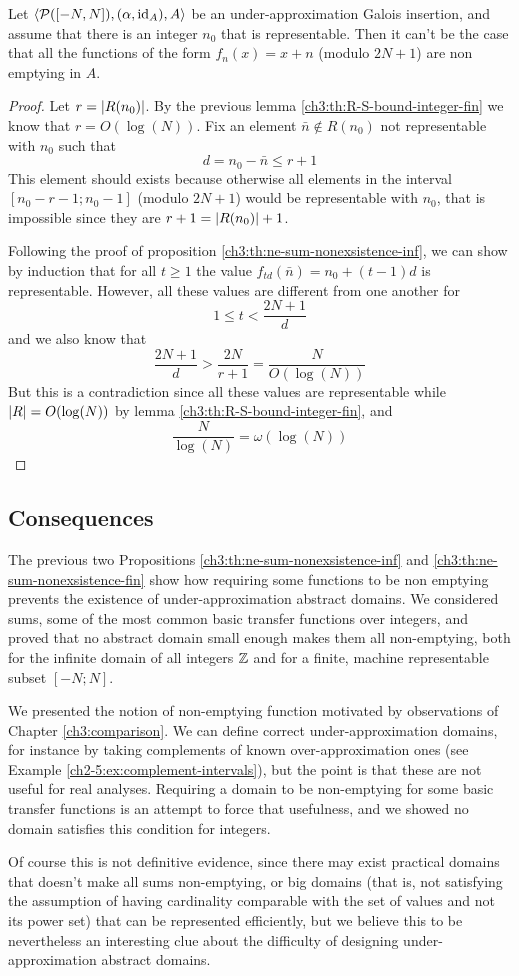 \begin{prop}\label{ch3:th:ne-sum-nonexsistence-fin}
	Let $\langle \mathcal{P}([-N, N]), (\alpha, \text{id}_{A}), A \rangle$ be an under-approximation Galois insertion, and assume that there is an integer $n_0$ that is representable. Then it can't be the case that all the functions of the form $f_n(x) = x + n$ (modulo $2N + 1$) are non emptying in $A$.
\end{prop}
\begin{proof}
	Let $r = \lvert R(n_0)\rvert$. By the previous lemma \ref{ch3:th:R-S-bound-integer-fin} we know that $r = O(\log(N))$. Fix an element $\bar{n} \notin R(n_0)$ not representable with $n_0$ such that
	\[
	d = n_0 - \bar{n} \le r + 1
	\]
	This element should exists because otherwise all elements in the interval $[n_0 - r - 1; n_0 - 1]$ (modulo $2N + 1$) would be representable with $n_0$, that is impossible since they are $r + 1 = \lvert R(n_0)\rvert + 1$.

	Following the proof of proposition \ref{ch3:th:ne-sum-nonexsistence-inf}, we can show by induction that for all $t \ge 1$ the value $f_{td}(\bar{n}) = n_0 + (t - 1) d$ is representable. However, all these values are different from one another for
	\[
	1 \le t < \frac{2N + 1}{d}
	\]
	and we also know that
	\[
	\frac{2N + 1}{d} > \frac{2N}{r + 1} = \frac{N}{O(\log(N))}
	\]
	But this is a contradiction since all these values are representable while $\lvert R\rvert = O(\log(N))$ by lemma \ref{ch3:th:R-S-bound-integer-fin}, and
	\[
	\frac{N}{\log(N)} = \omega( \log(N) )
	\]
\end{proof}

\subsection{Consequences}
The previous two Propositions \ref{ch3:th:ne-sum-nonexsistence-inf} and \ref{ch3:th:ne-sum-nonexsistence-fin} show how requiring some functions to be non emptying prevents the existence of under-approximation abstract domains. We considered sums, some of the most common basic transfer functions over integers, and proved that no abstract domain small enough makes them all non-emptying, both for the infinite domain of all integers $\mathbb{Z}$ and for a finite, machine representable subset $[-N; N]$.

We presented the notion of non-emptying function motivated by observations of Chapter \ref{ch3:comparison}. We can define correct under-approximation domains, for instance by taking complements of known over-approximation ones (see Example \ref{ch2-5:ex:complement-intervals}), but the point is that these are not useful for real analyses. Requiring a domain to be non-emptying for some basic transfer functions is an attempt to force that usefulness, and we showed no domain satisfies this condition for integers.

Of course this is not definitive evidence, since there may exist practical domains that doesn't make all sums non-emptying, or big domains (that is, not satisfying the assumption of having cardinality comparable with the set of values and not its power set) that can be represented efficiently, but we believe this to be nevertheless an interesting clue about the difficulty of designing under-approximation abstract domains.
